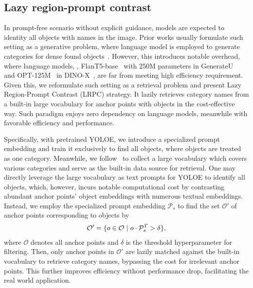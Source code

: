 \documentclass[10pt,twocolumn,letterpaper]{article}
\begin{document}
\subsection{Lazy region-prompt contrast}
\label{sec:lrpc}
In prompt-free scenario without explicit guidance, models are expected to identity all objects with names in the image. Prior works usually formulate such setting as a generative problem, where language model is employed to generate categories for dense found objects~\cite{lin2024generateu,ren2024dinox,wu2024grit}. However, this introduces notable overhead, where language models, \eg, FlanT5-base~\cite{chung2024scaling} with 250M parameters in GenerateU~\cite{lin2024generateu} and OPT-125M~\cite{zhang2022opt} in DINO-X~\cite{ren2024dinox}, are far from meeting high efficiency requirement. Given this, we reformulate such setting as a retrieval problem and present Lazy Region-Prompt Contrast (LRPC) strategy. It lazily retrieves category names from a built-in large vocabulary for anchor points with objects in the cost-effective way. Such paradigm enjoys zero dependency on language models, meanwhile with favorable efficiency and performance.

Specifically, with pretrained YOLOE, we introduce a specialized prompt embedding and train it exclusively to find all objects, where objects are treated as one category. Meanwhile, we follow~\cite{huang2023ram} to collect a large vocabulary which covers various categories and serve as the built-in data source for retrieval. One may directly leverage the large vocabulary as text prompts for YOLOE to identify all objects, which, however, incurs notable computational cost by contrasting abundant anchor points' object embeddings with numerous textual embeddings. Instead, we employ the specialized prompt embedding $\mathcal{P}_s$ to find the set $\mathcal{O}'$ of anchor points corresponding to objects by
\begin{equation}
    \small
    \setlength{\abovedisplayskip}{5pt}
    \setlength{\belowdisplayskip}{5pt}
    \mathcal{O}'=\{o \in \mathcal{O}\ |\ o \cdot \mathcal{P}_s^T > \delta\}, 
\end{equation} where $\mathcal{O}$ denotes all anchor points and $\delta$ is the threshold hyperparameter for filtering. Then, only anchor points in $\mathcal{O}'$ are lazily matched against the built-in vocabulary to retrieve category names, bypassing the cost for irrelevant anchor points. This further improves efficiency without performance drop, facilitating the real world application.
\end{document}
